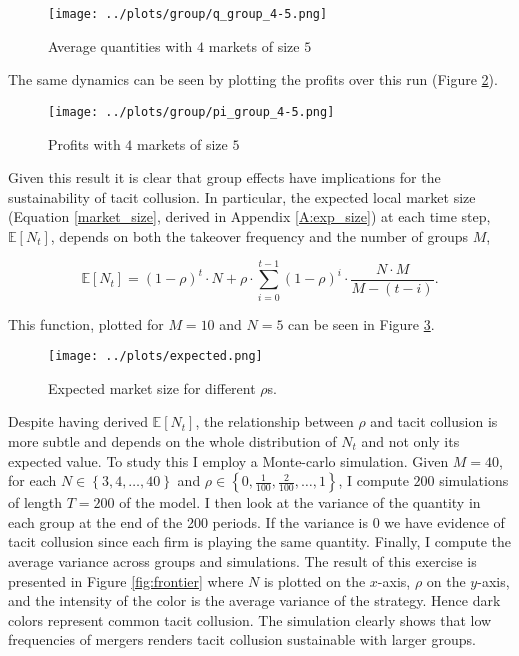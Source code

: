 \documentclass[american]{scrartcl}
\newcommand{\set}[1]{\left\{#1\right\}}
\newcommand{\E}{\mathbb{E}}
\begin{document}
\begin{figure}[H]
    \center
    \texttt{[image: ../plots/group/q\_group\_4-5.png]}
    \caption{Average quantities with $4$ markets of size $5$}
    \label{fig:small_avg}
\end{figure}

The same dynamics can be seen by plotting the profits over this run (Figure \ref{fig:small_avg_profit}).

\begin{figure}[H]
    \center
    \texttt{[image: ../plots/group/pi\_group\_4-5.png]}
    \caption{Profits with $4$ markets of size $5$}
    \label{fig:small_avg_profit}
\end{figure}

Given this result it is clear that group effects have implications for the sustainability of tacit collusion. In particular, the expected local market size (Equation \ref{market_size}, derived in Appendix \ref{A:exp_size}) at each time step, $\E[N_t]$, depends on both the takeover frequency and the number of groups $M$,

\begin{equation} \label{market_size}
    \E[N_t] = (1 - \rho)^t \cdot N + \rho \cdot \sum^{t-1}_{i = 0} (1 - \rho)^{i} \cdot \frac{N \cdot M}{M - (t - i)}.
\end{equation}

This function, plotted for $M = 10$ and $N = 5$ can be seen in Figure \ref{fig:size}.


\begin{figure}[H]
    \center
    \texttt{[image: ../plots/expected.png]}
    \caption{Expected market size for different $\rho$s.}
    \label{fig:size}
\end{figure}

Despite having derived $\E[N_t]$, the relationship between $\rho$ and tacit collusion is more subtle and depends on the whole distribution of $N_t$ and not only its expected value. To study this I employ a Monte-carlo simulation. Given $M = 40$, for each $N \in \set{3, 4, \ldots, 40}$ and $\rho \in \set{0, \frac{1}{100},\frac{2}{100}, \ldots, 1}$, I compute $200$ simulations of length $T = 200$ of the model. I then look at the variance of the quantity in each group at the end of the 200 periods. If the variance is 0 we have evidence of tacit collusion since each firm is playing the same quantity. Finally, I compute the average variance across groups and simulations. The result of this exercise is presented in Figure \ref{fig:frontier} where $N$ is plotted on the $x$-axis, $\rho$ on the $y$-axis, and the intensity of the color is the average variance of the strategy. Hence dark colors represent common tacit collusion. The simulation clearly shows that low frequencies of mergers renders tacit collusion sustainable with larger groups.
\end{document}
